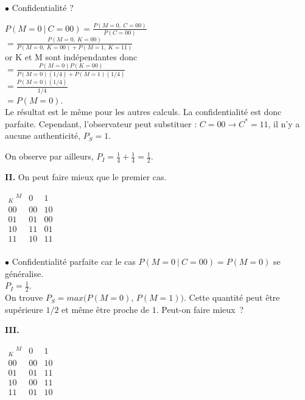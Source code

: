 \documentclass[12pt,a4paper]{article}
\begin{document}
$\bullet$ Confidentialité ?

\bigskip

$P(M=0\ \vert \ C=00) = \displaystyle\frac{P(M=0,\ C=00)}{P(C=00)}$\\
\hspace*{4,3cm}$=\displaystyle\frac{P(M=0,\ K=00)}{P(M=0,\ K=00) + P(M=1,\ K=11)}$\\
or K et M sont indépendantes donc \\
\hspace*{4,3cm}$=\displaystyle\frac{P(M=0)P(K=00)}{P(M=0)(1/4)+P(M=1)(1/4)}$\\
\hspace*{4,3cm}$=\displaystyle\frac{P(M=0)(1/4)}{1/4}$\\
\hspace*{4,3cm}$=P(M=0)$.\\

Le résultat est le même pour les autres calculs. La confidentialité est donc parfaite. Cependant, l'observateur peut substituer : $C=00 \rightarrow C^*=11$, il n'y a aucune authenticité, $P_S=1$.

\medskip

On observe par ailleurs, $P_I = \frac{1}{4}+\frac{1}{4}=\frac{1}{2}$.

\bigskip

\textbf{II.} On peut faire mieux que le premier cas.
\begin{center}
$\begin{array}{c|cc}
_K \ ^M & 0 & 1 \\
\hline
00 & 00 & 10 \\
01 & 01 & 00 \\
10 & 11 & 01 \\
11 & 10 & 11 \\
\end{array}$
\end{center}

$\bullet$ Confidentialité parfaite car le cas $P(M=0\ \vert \ C=00) =P(M=0)$ se généralise.\\

$P_I=\frac{1}{2}$.\\

On trouve $P_S=max(P(M=0)$, $P(M=1))$. Cette quantité peut être supérieure $1/2$ et même être proche de $1$. Peut-on faire mieux~?

\textbf{III.} 
\begin{center}
$\begin{array}{c|cc}
_K \ ^M & 0 & 1 \\
\hline
00 & 00 & 10 \\
01 & 01 & 11 \\
10 & 00 & 11 \\
11 & 01 & 10 \\
\end{array}$
\end{center}
\end{document}

